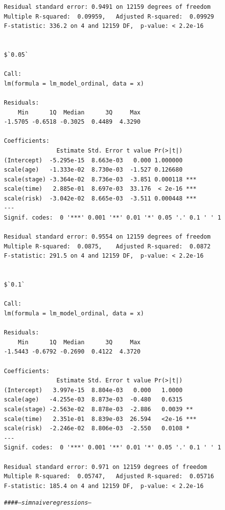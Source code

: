 \documentclass[]{revtex4}\usepackage[]{graphicx}\usepackage[]{color}
\makeatletter
\newcommand{\hlcom}[1]{\textcolor[rgb]{0.678,0.584,0.686}{\textit{#1}}}%
\newenvironment{kframe}{%
 \def\at@end@of@kframe{}%
 \ifinner\ifhmode%
  \def\at@end@of@kframe{\end{minipage}}%
  \begin{minipage}{\columnwidth}%
 \fi\fi%
 \def\FrameCommand##1{\hskip\@totalleftmargin \hskip-\fboxsep
 \colorbox{shadecolor}{##1}\hskip-\fboxsep
     \hskip-\linewidth \hskip-\@totalleftmargin \hskip\columnwidth}%
 \MakeFramed {\advance\hsize-\width
   \@totalleftmargin\z@ \linewidth\hsize
   \@setminipage}}%
 {\par\unskip\endMakeFramed%
 \at@end@of@kframe}
\newenvironment{knitrout}{}{} %
\makeatother
\begin{document}
\begin{knitrout}
\begin{kframe}
\begin{verbatim}
Residual standard error: 0.9491 on 12159 degrees of freedom
Multiple R-squared:  0.09959,	Adjusted R-squared:  0.09929 
F-statistic: 336.2 on 4 and 12159 DF,  p-value: < 2.2e-16


$`0.05`

Call:
lm(formula = lm_model_ordinal, data = x)

Residuals:
    Min      1Q  Median      3Q     Max 
-1.5705 -0.6518 -0.3025  0.4489  4.3290 

Coefficients:
               Estimate Std. Error t value Pr(>|t|)    
(Intercept)  -5.295e-15  8.663e-03   0.000 1.000000    
scale(age)   -1.333e-02  8.730e-03  -1.527 0.126680    
scale(stage) -3.364e-02  8.736e-03  -3.851 0.000118 ***
scale(time)   2.885e-01  8.697e-03  33.176  < 2e-16 ***
scale(risk)  -3.042e-02  8.665e-03  -3.511 0.000448 ***
---
Signif. codes:  0 '***' 0.001 '**' 0.01 '*' 0.05 '.' 0.1 ' ' 1

Residual standard error: 0.9554 on 12159 degrees of freedom
Multiple R-squared:  0.0875,	Adjusted R-squared:  0.0872 
F-statistic: 291.5 on 4 and 12159 DF,  p-value: < 2.2e-16


$`0.1`

Call:
lm(formula = lm_model_ordinal, data = x)

Residuals:
    Min      1Q  Median      3Q     Max 
-1.5443 -0.6792 -0.2690  0.4122  4.3720 

Coefficients:
               Estimate Std. Error t value Pr(>|t|)    
(Intercept)   3.997e-15  8.804e-03   0.000   1.0000    
scale(age)   -4.255e-03  8.873e-03  -0.480   0.6315    
scale(stage) -2.563e-02  8.878e-03  -2.886   0.0039 ** 
scale(time)   2.351e-01  8.839e-03  26.594   <2e-16 ***
scale(risk)  -2.246e-02  8.806e-03  -2.550   0.0108 *  
---
Signif. codes:  0 '***' 0.001 '**' 0.01 '*' 0.05 '.' 0.1 ' ' 1

Residual standard error: 0.971 on 12159 degrees of freedom
Multiple R-squared:  0.05747,	Adjusted R-squared:  0.05716 
F-statistic: 185.4 on 4 and 12159 DF,  p-value: < 2.2e-16
\end{verbatim}
\begin{alltt}
\hlcom{####--- sim naive regressions ---}
\end{alltt}
\end{kframe}
\end{knitrout}
\end{document}
